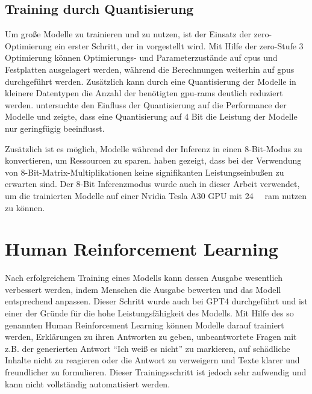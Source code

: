 \subsection{Training durch Quantisierung}
Um große Modelle zu trainieren und zu nutzen, ist der Einsatz der \ac{zero}-Optimierung ein erster Schritt, der in \citet{deepspeed} vorgestellt wird.
Mit Hilfe der \ac{zero}-Stufe 3 Optimierung können Optimierungs- und Parameterzustände auf \ac{cpu}s und Festplatten ausgelagert werden, während die Berechnungen weiterhin auf \ac{gpu}s durchgeführt werden.
Zusätzlich kann durch eine Quantisierung der Modelle in kleinere Datentypen die Anzahl der benötigten \ac{gpu}-\ac{ram}s deutlich reduziert werden.
\citet{4bit} untersuchte den Einfluss der Quantisierung auf die Performance der Modelle und zeigte, dass eine Quantisierung auf 4 Bit die Leistung der Modelle nur geringfügig beeinflusst.\\

Zusätzlich ist es möglich, Modelle während der Inferenz in einen 8-Bit-Modus zu konvertieren, um Ressourcen zu sparen.
\citet{8bit-inference} haben gezeigt, dass bei der Verwendung von 8-Bit-Matrix-Multiplikationen keine signifikanten Leistungseinbußen zu erwarten sind.
Der 8-Bit Inferenzmodus wurde auch in dieser Arbeit verwendet, um die trainierten Modelle auf einer Nvidia Tesla A30 GPU mit \SI{24}{\giga\byte} \ac{ram} nutzen zu können.\\

\section{Human Reinforcement Learning}
Nach erfolgreichem Training eines Modells kann dessen Ausgabe wesentlich verbessert werden, indem Menschen die Ausgabe bewerten und das Modell entsprechend anpassen.
Dieser Schritt wurde auch bei GPT4 durchgeführt und ist einer der Gründe für die hohe Leistungsfähigkeit des Modells.
Mit Hilfe des so genannten Human Reinforcement Learning können Modelle darauf trainiert werden, Erklärungen zu ihren Antworten zu geben, unbeantwortete Fragen mit z.B. der generierten Antwort \enquote{Ich weiß es nicht} zu markieren, auf schädliche Inhalte nicht zu reagieren oder die Antwort zu verweigern und Texte klarer und freundlicher zu formulieren.
Dieser Trainingsschritt ist jedoch sehr aufwendig und kann nicht vollständig automatisiert werden.\\

